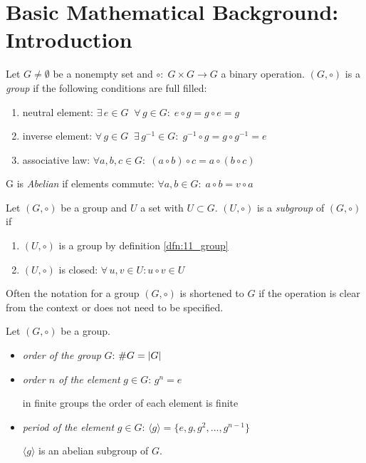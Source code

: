 \newpage
\section{Basic Mathematical Background: Introduction}

\begin{dfn}[Group]\label{dfn:11_group}
Let $G \neq \emptyset $ be a nonempty set and $\circ: \; G \times G \rightarrow G$ a  binary operation. $(G, \circ)$ is a \textit{group} if the following conditions are full filled:
\begin{enumerate}
    \item neutral element: $\exists \, e\in G \; \; \forall \, g \in G: \; e \circ g = g \circ e = g$
    \item inverse element: $\forall \, g \in G \; \; \exists \, g^{-1} \in G: \; g^{-1} \circ g = g \circ g^{-1} = e$
    \item associative law: $\forall a,b,c \in G: \; \left(a \circ b \right) \circ c = a \circ \left(b \circ c \right)$
\end{enumerate}

\noindent G is \textit{Abelian} if elements commute: $\forall a,b \in G: \; a \circ b = v \circ a$
\end{dfn}

\begin{dfn}[Subgroup]\label{dfn:12_subgroup}
Let $(G, \circ)$ be a group and $U$ a set with $U \subset G$. $(U, \circ)$ is a \textit{subgroup} of $(G, \circ)$ if
\begin{enumerate}
    \item $(U, \circ)$ is a group by definition \ref{dfn:11_group}
    \item $(U, \circ)$ is closed: $\forall \, u,v \in U: u \circ v \in U$
\end{enumerate}
\end{dfn}

Often the notation for a group $(G, \circ)$ is shortened to $G$ if the operation is clear from the context or does not need to be specified.

\begin{dfn}\label{dfn:13_order}
Let $(G, \circ)$ be a group. 
\begin{itemize}
    \item \textit{order of the group} $G$: $\# G = \left| G \right|$
    \item \textit{order $n$ of the element} $g \in G$: $g^n = e$ \par in finite groups the order of each element is finite
    \item \textit{period of the element} $g \in G$: $\langle g \rangle = \lbrace e, g, g^2, \dots, g^{n-1} \rbrace$ \par $\langle g \rangle$ is an abelian subgroup of $G$.
\end{itemize}
\end{dfn}
